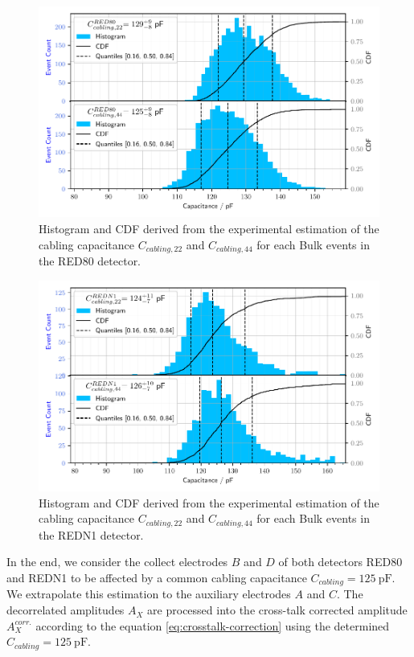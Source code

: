 \begin{figure}
\centering
\includegraphics[scale=1]{Figures/ElectrodesExperimental/red80_cabling_capacitance_fitting.pdf}
\caption{Histogram and CDF derived from the experimental estimation of the cabling capacitance  $C_{cabling, 22}$ and $C_{cabling, 44}$ for each Bulk events in the RED80 detector.}
\label{fig:red80-cabling-capacitance}
\end{figure}

\begin{figure}
\centering
\includegraphics[scale=1]{Figures/ElectrodesExperimental/redn1_cabling_capacitance_fitting.pdf}
\caption{Histogram and CDF derived from the experimental estimation of the cabling capacitance  $C_{cabling, 22}$ and $C_{cabling, 44}$ for each Bulk events in the REDN1 detector.}
\label{fig:redn1-cabling-capacitance}
\end{figure}

In the end, we consider the collect electrodes $B$ and $D$ of both detectors RED80 and REDN1 to be affected by a common cabling capacitance $C_{cabling} = \SI{125}{\pico\farad}$. We extrapolate this estimation to the auxiliary electrodes $A$ and $C$. The decorrelated amplitudes $A_X$ are processed into the cross-talk corrected amplitude $A_X^{corr.}$ according to the equation \ref{eq:crosstalk-correction} using the determined $C_{cabling}=\SI{125}{\pico\farad}$.

